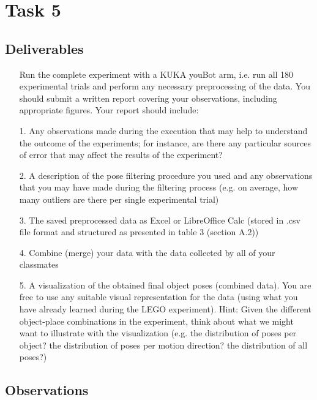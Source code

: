 
    \chapter{Task 5}
    \section{Deliverables }
    \begin{itemize}
        \item[] Run the complete experiment with a KUKA youBot arm, i.e. run all 180 experimental trials and perform any necessary preprocessing of the data. You should submit a written report covering your observations, including appropriate figures. Your report should include:
    \end{itemize}
    
    \begin{itemize}
        \item[1.] Any observations made during the execution that may help to understand the outcome of the experiments; for instance, are there any particular sources of error that may affect the results of the experiment?
        \item[2.] A description of the pose filtering procedure you used and any observations that you may have made during the filtering process (e.g. on average, how many outliers are there per single experimental trial)
        \item[3.] The saved preprocessed data as Excel or LibreOffice Calc (stored in .csv file format and structured as presented in table 3 (section A.2))
        \item[4.] Combine (merge) your data with the data collected by all of your classmates
        \item[5.] A visualization of the obtained final object poses (combined data). You are free to use any suitable visual representation for the data (using what you have already learned during the LEGO experiment). Hint: Given the different object-place combinations in the experiment, think about what we might want to illustrate with the visualization (e.g. the distribution of poses per object? the distribution of poses per motion direction? the distribution of all poses?)
    \end{itemize}
    
    \section{Observations}
    
